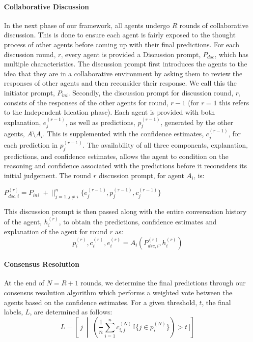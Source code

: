 \documentclass[letterpaper]{article} %
\begin{document}
\paragraph{\textbf{Collaborative Discussion}}
In the next phase of our framework, all agents undergo $R$ rounds of collaborative discussion. This is done to ensure each agent is fairly exposed to the thought process of other agents before coming up with their final predictions. For each discussion round, $r$, every agent is provided a Discussion prompt, $P_{dsc}$, which has multiple characteristics. The discussion prompt first introduces the agents to the idea that they are in a collaborative environment by asking them to review the responses of other agents and then reconsider their response. We call this the initiator prompt, $P_{ini}$. Secondly, the discussion prompt for discussion round, $r$, consists of the responses of the other agents for round, $r-1$ (for $r = 1$ this refers to the Independent Ideation phase). Each agent is provided with both explanation, $e_j^{(r-1)}$, as well as predictions, $p_j^{(r-1)}$, generated by the other agents, $A \setminus A_i$. This is supplemented with the confidence estimates, $c_j^{(r-1)}$, for each prediction in $p_j^{(r-1)}$. The availability of all three components, explanation, predictions, and confidence estimates, allows the agent to condition on the reasoning and confidence associated with the predictions before it reconsiders its initial judgement. The round $r$ discussion prompt, for agent $A_i$, is:
\begin{center}
     $P_{dsc, i}^{(r)} = P_{ini} \;+ \big\|_{j=1, j \neq i}^{n} \{ e_j^{(r-1)}, p_j^{(r-1)}, c_j^{(r-1)} \}$
\end{center}
This discussion prompt is then passed along with the entire conversation history of the agent, $h_i^{(r)}$, to obtain the predictions, confidence estimates and explanation of the agent for round $r$ as:
\begin{equation}
    p_{i}^{(r)}, c_i^{(r)}, e_i^{(r)} = A_i(P_{dsc, i}^{(r)}, h_i^{(r)})
\end{equation}

\paragraph{\textbf{Consensus Resolution}} At the end of $N = R + 1$ rounds, we determine the final predictions through our consensus resolution algorithm which performs a weighted vote between the agents based on the confidence estimates. For a given threshold, $t$, the final labels, $L$, are determined as follows:
\begin{equation}
L= \left[\,  j \;\middle|\; (\frac{1}{n}\sum_{i=1}^{n} c_{i,j}^{(N)}\,\mathbb{I}\{j\in p_i^{(N)}\} ) > t \,]
\right]
\end{equation}
\end{document}
